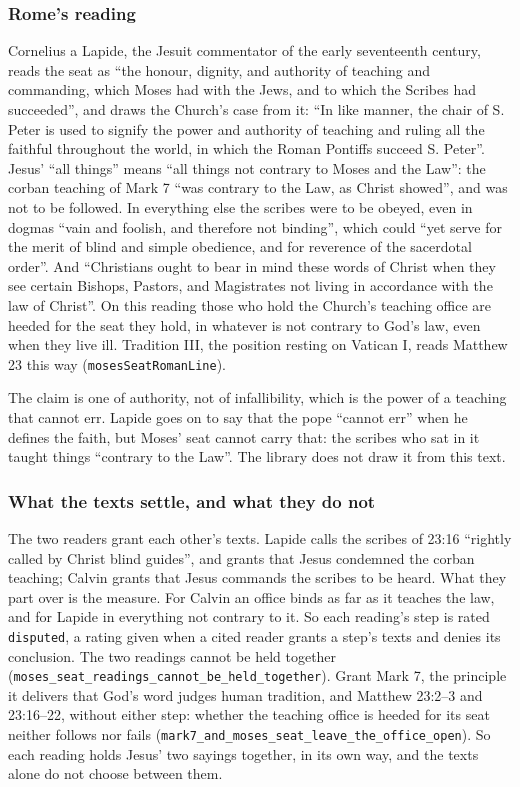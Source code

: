 \documentclass[11pt]{article}
\begin{document}
\subsubsection*{Rome’s reading}
Cornelius a Lapide, the Jesuit commentator of the early seventeenth century, reads the seat as “the honour, dignity, and authority of teaching and commanding, which Moses had with the Jews, and to which the Scribes had succeeded”, and draws the Church’s case from it: “In like manner, the chair of S. Peter is used to signify the power and authority of teaching and ruling all the faithful throughout the world, in which the Roman Pontiffs succeed S. Peter”. Jesus’ “all things” means “all things not contrary to Moses and the Law”: the corban teaching of Mark 7 “was contrary to the Law, as Christ showed”, and was not to be followed. In everything else the scribes were to be obeyed, even in dogmas “vain and foolish, and therefore not binding”, which could “yet serve for the merit of blind and simple obedience, and for reverence of the sacerdotal order”. And “Christians ought to bear in mind these words of Christ when they see certain Bishops, Pastors, and Magistrates not living in accordance with the law of Christ”. On this reading those who hold the Church’s teaching office are heeded for the seat they hold, in whatever is not contrary to God’s law, even when they live ill. Tradition III, the position resting on Vatican I, reads Matthew 23 this way (\texttt{moses\allowbreak{}Seat\allowbreak{}Roman\allowbreak{}Line}).

The claim is one of authority, not of infallibility, which is the power of a teaching that cannot err. Lapide goes on to say that the pope “cannot err” when he defines the faith, but Moses’ seat cannot carry that: the scribes who sat in it taught things “contrary to the Law”. The library does not draw it from this text.

\subsubsection*{What the texts settle, and what they do not}
The two readers grant each other’s texts. Lapide calls the scribes of 23:16 “rightly called by Christ blind guides”, and grants that Jesus condemned the corban teaching; Calvin grants that Jesus commands the scribes to be heard. What they part over is the measure. For Calvin an office binds as far as it teaches the law, and for Lapide in everything not contrary to it. So each reading’s step is rated \texttt{disputed}, a rating given when a cited reader grants a step’s texts and denies its conclusion. The two readings cannot be held together (\texttt{moses\_\allowbreak{}seat\_\allowbreak{}readings\_\allowbreak{}cannot\_\allowbreak{}be\_\allowbreak{}held\_\allowbreak{}together}). Grant Mark 7, the principle it delivers that God’s word judges human tradition, and Matthew 23:2–3 and 23:16–22, without either step: whether the teaching office is heeded for its seat neither follows nor fails (\texttt{mark7\_\allowbreak{}and\_\allowbreak{}moses\_\allowbreak{}seat\_\allowbreak{}leave\_\allowbreak{}the\_\allowbreak{}office\_\allowbreak{}open}). So each reading holds Jesus’ two sayings together, in its own way, and the texts alone do not choose between them.
\end{document}
